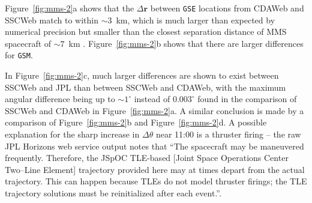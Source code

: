 \documentclass[draft]{agujournal2019}
\begin{document}
Figure~\ref{fig:mms-2}a shows that the $\Delta \mathbf{r}$ between \texttt{GSE} locations from CDAWeb and SSCWeb match to within ${\sim}3$~km, which is much larger than expected by numerical precision but smaller than the closest separation distance of MMS spacecraft of ${\sim}7$~km \cite{NASA2016}. Figure~\ref{fig:mms-2}b shows that there are larger differences for \texttt{GSM}.

In Figure~\ref{fig:mms-2}c, much larger differences are shown to exist between SSCWeb and JPL than between SSCWeb and CDAWeb, with the maximum angular difference being up to ${\sim}1^\circ$ instead of $0.003^\circ$ found in the comparison of SSCWeb and CDAWeb in Figure~\ref{fig:mms-2}a. A similar conclusion is made by a comparison of Figure~\ref{fig:mms-2}b and Figure~\ref{fig:mms-2}d. A possible explanation for the sharp increase in $\Delta \theta$ near 11:00 is a thruster firing -- the raw JPL Horizons web service output notes that ``The spacecraft may be maneuvered frequently. Therefore, the JSpOC TLE-based [Joint Space Operations Center Two--Line Element] trajectory provided here may at times depart from the actual trajectory. This can happen because TLEs do not model thruster firings; the TLE trajectory solutions must be reinitialized after each event.''.




\end{document}
